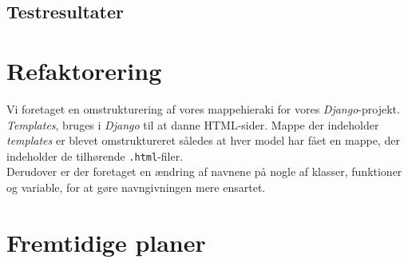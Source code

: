 \documentclass[11pt]{article}
\begin{document}
\subsection{Testresultater}

\section{Refaktorering}
Vi foretaget en omstrukturering af vores mappehieraki for vores \textit{Django}-projekt. \textit{Templates}, bruges i \textit{Django} til at danne HTML-sider. Mappe der indeholder \textit{templates} er blevet omstruktureret således at hver model har fået en mappe, der indeholder de tilhørende \texttt{.html}-filer. \\
Derudover er der foretaget en ændring af navnene på nogle af klasser, funktioner og variable, for at gøre navngivningen mere ensartet.

\section{Fremtidige planer}
\end{document}

